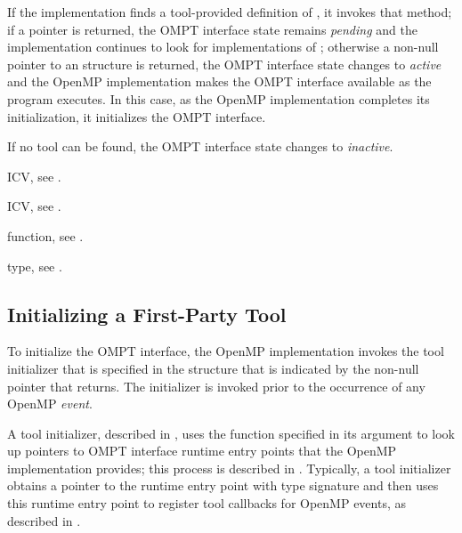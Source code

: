 If the implementation finds a tool-provided definition of 
, it invokes that method; if a  pointer 
is returned, the OMPT interface state remains \emph{pending} and the 
implementation continues to look for implementations of ;
otherwise a non-null pointer to an  
structure is returned, the OMPT interface state changes to \emph{active} 
and the OpenMP implementation makes the OMPT interface available as the 
program executes. In this case, as the OpenMP implementation completes its 
initialization, it initializes the OMPT interface.

If no tool can be found, the OMPT interface state changes to \emph{inactive}.

\begin{crossrefs}
\item {} ICV, 
see .

\item {} ICV, see .

\item {} function, see .

\item {} type, 
see .
\end{crossrefs}

\subsection{Initializing a First-Party Tool}
\label{sec:tool-initialize}

To initialize the OMPT interface, the OpenMP implementation invokes the tool 
initializer that is specified in the  structure
that is indicated by the non-null pointer that  returns.
The initializer is invoked prior to the occurrence of any OpenMP \emph{event}.

A tool initializer, described in , uses the 
function specified in its  argument to look up pointers to OMPT 
interface runtime entry points that the OpenMP implementation provides; this 
process is described in . Typically, a tool initializer
obtains a pointer to the   runtime entry point with 
type signature  and then uses this runtime entry 
point to register tool callbacks for OpenMP events, as described in 
.

